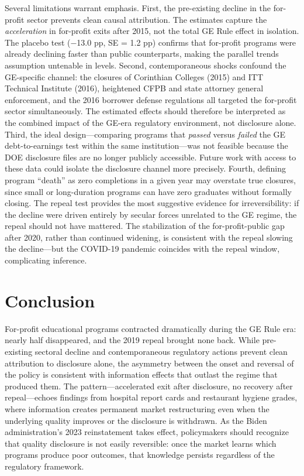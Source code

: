 \documentclass[12pt]{article}
\begin{document}
Several limitations warrant emphasis. First, the pre-existing decline in the for-profit sector prevents clean causal attribution. The estimates capture the \textit{acceleration} in for-profit exits after 2015, not the total GE Rule effect in isolation. The placebo test ($-$13.0 pp, SE = 1.2 pp) confirms that for-profit programs were already declining faster than public counterparts, making the parallel trends assumption untenable in levels. Second, contemporaneous shocks confound the GE-specific channel: the closures of Corinthian Colleges (2015) and ITT Technical Institute (2016), heightened CFPB and state attorney general enforcement, and the 2016 borrower defense regulations all targeted the for-profit sector simultaneously. The estimated effects should therefore be interpreted as the combined impact of the GE-era regulatory environment, not disclosure alone. Third, the ideal design---comparing programs that \textit{passed} versus \textit{failed} the GE debt-to-earnings test within the same institution---was not feasible because the DOE disclosure files are no longer publicly accessible. Future work with access to these data could isolate the disclosure channel more precisely. Fourth, defining program ``death'' as zero completions in a given year may overstate true closures, since small or long-duration programs can have zero graduates without formally closing. The repeal test provides the most suggestive evidence for irreversibility: if the decline were driven entirely by secular forces unrelated to the GE regime, the repeal should not have mattered. The stabilization of the for-profit-public gap after 2020, rather than continued widening, is consistent with the repeal slowing the decline---but the COVID-19 pandemic coincides with the repeal window, complicating inference.

\section{Conclusion}

For-profit educational programs contracted dramatically during the GE Rule era: nearly half disappeared, and the 2019 repeal brought none back. While pre-existing sectoral decline and contemporaneous regulatory actions prevent clean attribution to disclosure alone, the asymmetry between the onset and reversal of the policy is consistent with information effects that outlast the regime that produced them. The pattern---accelerated exit after disclosure, no recovery after repeal---echoes findings from hospital report cards and restaurant hygiene grades, where information creates permanent market restructuring even when the underlying quality improves or the disclosure is withdrawn. As the Biden administration's 2023 reinstatement takes effect, policymakers should recognize that quality disclosure is not easily reversible: once the market learns which programs produce poor outcomes, that knowledge persists regardless of the regulatory framework.
\end{document}
